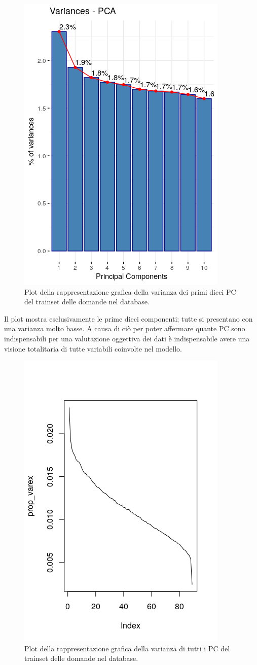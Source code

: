 \begin{figure}[H]
\centering
	\includegraphics[width=0.60\linewidth]{../../PCA/plot/variances_rete-db.png}
	\caption{Plot della rappresentazione grafica della varianza dei primi dieci PC del trainset delle domande nel database.}
\end{figure}
\noindent
Il plot mostra esclusivamente le prime dieci componenti; tutte si presentano con una varianza molto basse. A causa di ci\`o per poter affermare quante PC sono indispensabili per una valutazione oggettiva dei dati \`e indispensabile avere una visione totalitaria di tutte variabili coinvolte nel modello.
\begin{figure}[H]
\centering
	\includegraphics[width=0.60\linewidth]{../../PCA/plot/variances-ALL_rete-db.png}
	\caption{Plot della rappresentazione grafica della varianza di tutti i PC del trainset delle domande nel database.}
\end{figure}
